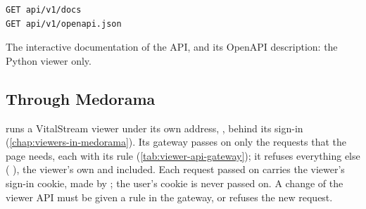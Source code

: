 \begin{lstlisting}[style=signature]
GET api/v1/docs
GET api/v1/openapi.json
\end{lstlisting}
The interactive documentation of the API, and its OpenAPI description: the Python viewer only.

\subsection{Through Medorama}
\label{sec:viewer-api-gateway}

\md{} runs a VitalStream viewer under its own address, , behind its sign-in
(\cref{chap:viewers-in-medorama}). Its gateway passes on only the requests that the page needs,
each with its rule (\cref{tab:viewer-api-gateway}); it refuses everything else (
), the viewer's own  and 
included. Each request passed on carries the viewer's sign-in cookie, made by \md{}; the
user's \md{} cookie is never passed on. A change of the viewer API must be given a rule in the
gateway, or \md{} refuses the new request.

